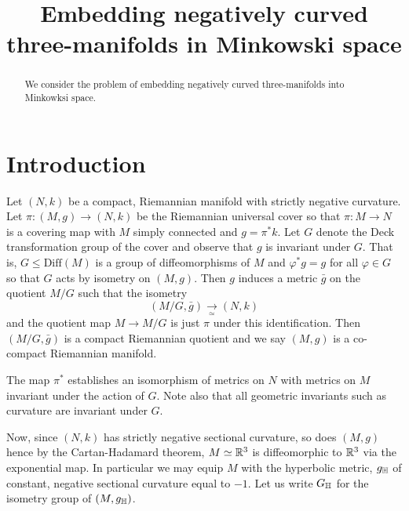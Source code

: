 \documentclass[a4paper, 12pt]{amsart}
\begin{document}
\title[Negative curvature Minkowski embedding]{Embedding negatively curved three-manifolds in Minkowski space}

\date{}

\dedicatory{}

\maketitle

\begin{abstract}
We consider the problem of embedding negatively curved three-manifolds into Minkowksi space.
\end{abstract}

\section{Introduction}
\label{sec:intro}

Let \((N, k)\) be a compact, Riemannian manifold with strictly negative curvature. Let \(\pi : (M, g) \to (N, k)\) be the Riemannian universal cover so that \(\pi : M \to N\) is a covering map with \(M\) simply connected and \(g = \pi^{\ast} k\). Let \(G\) denote the Deck transformation group of the cover and observe that \(g\) is invariant under \(G\). That is, \(G \leq \text{Diff}(M)\) is a group of diffeomorphisms of \(M\) and \(\varphi^{\ast} g = g\) for all \(\varphi \in G\) so that \(G\) acts by isometry on \((M, g)\). Then \(g\) induces a metric \(\bar{g}\) on the quotient \(M/G\) such that the isometry
\[
(M/G, \bar{g}) \underset{\simeq}{\to} (N, k)
\]
and the quotient map \(M \to M/G\) is just \(\pi\) under this identification. Then \((M/G, \bar{g})\) is a compact Riemannian quotient and we say \((M, g)\) is a co-compact Riemannian manifold.

\begin{rem}
The map \(\pi^{\ast}\) establishes an isomorphism of metrics on \(N\) with metrics on \(M\) invariant under the action of \(G\). Note also that all geometric invariants such as curvature are invariant under \(G\).
\end{rem}

Now, since \((N, k)\) has strictly negative sectional curvature, so does \((M, g)\) hence by the Cartan-Hadamard theorem, \(M \simeq \mathbb{R}^3\) is diffeomorphic to \(\mathbb{R}^3\) via the exponential map. In particular we may equip \(M\) with the hyperbolic metric, \(g_{\mathbb{H}}\) of constant, negative sectional curvature equal to \(-1\). Let us write \(G_{\mathbb{H}}\) for the isometry group of \((M, g_{\mathbb{H}})\).
\end{document}
